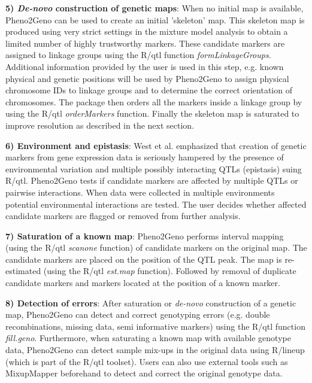 {\bf 5) \emph{De-novo} construction of genetic maps}: 
When no initial map is available, Pheno2Geno can be used to create an initial 'skeleton' 
map. This skeleton map is produced using very strict settings in the mixture model 
analysis to obtain a limited number of highly trustworthy markers. These candidate markers 
are assigned to linkage groups using the R/qtl function \emph{formLinkageGroups}. 
Additional information provided by the user is used in this step, e.g. known physical 
and genetic positions will be used by Pheno2Geno to assign physical chromosome IDs to 
linkage groups and to determine the correct orientation of chromosomes. The package then 
orders all the markers inside a linkage group by using the R/qtl \emph{orderMarkers} 
function. Finally the skeleton map is saturated to improve resolution as described in 
the next section.

{\bf 6) Environment and epistasis}: 
West et al. \cite{West:2007} emphasized that creation of genetic markers from gene expression data 
is seriously hampered by the presence of environmental variation and multiple possibly interacting 
QTLs (epistasis) suing R/qtl. Pheno2Geno tests if candidate markers are affected by multiple QTLs or pairwise 
interactions. When data were collected in multiple environments potential environmental interactions 
are tested. The user decides whether affected candidate markers are flagged or removed from further analysis.

{\bf 7) Saturation of a known map}:
Pheno2Geno performs interval mapping (using the R/qtl \emph{scanone} function) of 
candidate markers on the original map. The candidate markers are placed on the position 
of the QTL peak. The map is re-estimated (using the R/qtl \emph{est.map} function). 
Followed by  removal of duplicate candidate markers and markers located at the position 
of a known marker.

{\bf 8) Detection of errors}:
After saturation or \emph{de-novo} construction of a genetic map, Pheno2Geno can detect 
and correct genotyping errors (e.g. double recombinations, missing data, semi informative 
markers) using the R/qtl function \emph{fill.geno}. Furthermore, when saturating a known 
map with available genotype data, Pheno2Geno can detect sample mix-ups in the 
original data using R/lineup (which is part of the R/qtl toolset). Users can also use 
external tools such as MixupMapper \cite{Westra:2011} beforehand to detect and correct the 
original genotype data.


